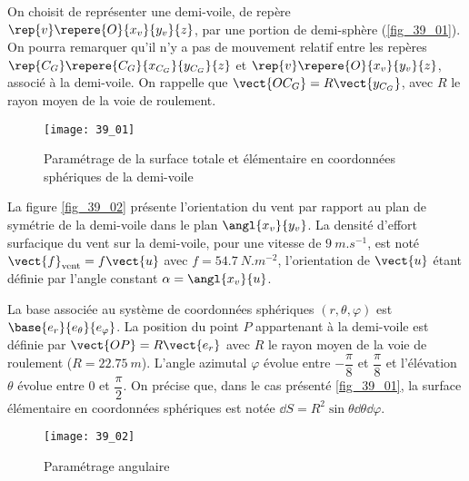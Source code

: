 \normaltrue \difficilefalse \tdifficilefalse
\correctionfalse


\setcounter{question}{0}
\ifcorrection
\else
{}
\fi

\ifprof
\else
On choisit de représenter une demi-voile, de repère $\rep{v}\repere{O}{x_v}{y_v}{z}$, par une portion de demi-sphère (\autoref{fig_39_01}).
On pourra remarquer qu’il n’y a pas de mouvement relatif entre les repères $\rep{C_G}\repere{C_G}{x_{C_G}}{y_{C_G}}{z}$ et $\rep{v}\repere{O}{x_v}{y_v}{z}$, 
associé à la demi-voile. On rappelle que $\vect{OC_G}=R\vect{y_{C_G}}$, avec $R$ le rayon moyen de la voie de roulement.


\begin{figure}[H]
\centering
\texttt{[image: 39\_01]}
\caption{Paramétrage de la surface totale et élémentaire en coordonnées sphériques de la demi-voile \label{fig_39_01}}
\end{figure}

La figure \autoref{fig_39_02} présente l’orientation du vent par rapport au plan de symétrie de la demi-voile dans le plan $\angl{x_v}{y_v}$. La densité d’effort surfacique du vent sur la demi-voile, pour une vitesse de $\SI{9}{m.s^{-1}}$, est noté $\vect{f}_{\text{vent}}=f\vect{u}$ avec $f=\SI{54,7}{N.m^{-2}}$, l’orientation de $\vect{u}$ étant définie par l’angle constant $\alpha=\angl{x_v}{u}$.

La base associée au système de coordonnées sphériques $\left(r,\theta,\varphi\right)$ est $\base{e_r}{e_{\theta}}{e_{\varphi}}$. La position du point $P$ appartenant
à la demi-voile est définie par $\vect{OP}=R\vect{e_r}$ avec $R$ le rayon moyen de la voie de roulement ($R=\SI{22,75}{m}$).
L’angle azimutal $\varphi$ évolue entre $-\dfrac{\pi}{8}$ et $\dfrac{\pi}{8}$ et l’élévation $\theta$ évolue entre 0 et $\dfrac{\pi}{2}$.
On précise que, dans le cas présenté \autoref{fig_39_01}, la surface élémentaire en coordonnées sphériques est notée
$\dd S =R^2 \sin \theta \dd\theta \dd \varphi$.


\begin{figure}[H]
\centering
\texttt{[image: 39\_02]}
\caption{Paramétrage angulaire \label{fig_39_02}}
\end{figure}

